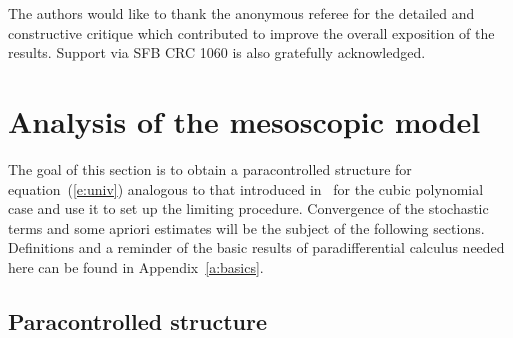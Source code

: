 \begin{acknowledgments*}
  The authors would like to thank the anonymous referee for the detailed and
  constructive critique which contributed to improve the overall exposition of
  the results. Support via SFB CRC 1060 is also gratefully acknowledged. 
\end{acknowledgments*}

\section{\label{s:universal-analytic}Analysis of the mesoscopic model}

The goal of this section is to obtain a paracontrolled structure for
equation~(\ref{e:univ}) analogous to that introduced
in~{\cite{catellier_paracontrolled_2013}} for the cubic polynomial case and
use it to set up the limiting procedure. Convergence of the stochastic terms
and some apriori estimates will be the subject of the following sections.
Definitions and a reminder of the basic results of paradifferential calculus
needed here can be found in Appendix~\ref{a:basics}.

\subsection{\label{s:paracontrolled-struc}Paracontrolled structure}

